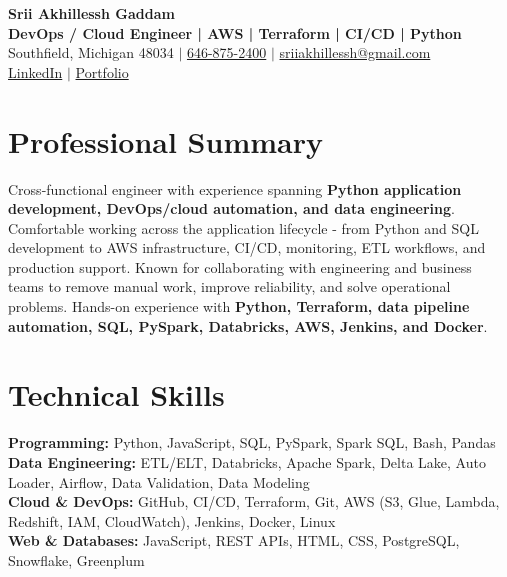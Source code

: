 \documentclass[letterpaper,10pt]{article}
\begin{document}
\fontsize{9.35pt}{10.45pt}\selectfont

\begin{center}
    {\LARGE \textbf{Srii Akhillessh Gaddam}} \\[-1pt]
    \textbf{DevOps / Cloud Engineer | AWS | Terraform | CI/CD | Python} \\[2pt]
    Southfield, Michigan 48034 $|$
    \href{tel:6468752400}{646-875-2400} $|$
    \href{mailto:sriiakhillessh@gmail.com}{sriiakhillessh@gmail.com} \\[1pt]
    \href{https://www.linkedin.com/in/srii-akhiilessh-gaddam-b48668191/}{LinkedIn} $|$
    \href{https://sriiakhillesshg.github.io/portfolio/}{Portfolio}
\end{center}
\vspace{-8pt}

\section{Professional Summary}
\small{Cross-functional engineer with experience spanning \textbf{Python application development, DevOps/cloud automation, and data engineering}. Comfortable working across the application lifecycle - from Python and SQL development to AWS infrastructure, CI/CD, monitoring, ETL workflows, and production support. Known for collaborating with engineering and business teams to remove manual work, improve reliability, and solve operational problems. Hands-on experience with \textbf{Python, Terraform, data pipeline automation, SQL, PySpark, Databricks, AWS, Jenkins, and Docker}.}

\section{Technical Skills}
\small{
\textbf{Programming:} Python, JavaScript, SQL, PySpark, Spark SQL, Bash, Pandas \\
\textbf{Data Engineering:} ETL/ELT, Databricks, Apache Spark, Delta Lake, Auto Loader, Airflow, Data Validation, Data Modeling \\
\textbf{Cloud \& DevOps:} GitHub, CI/CD, Terraform, Git, AWS (S3, Glue, Lambda, Redshift, IAM, CloudWatch), Jenkins, Docker, Linux \\
\textbf{Web \& Databases:} JavaScript, REST APIs, HTML, CSS, PostgreSQL, Snowflake, Greenplum
}
\end{document}
